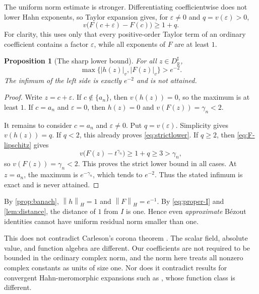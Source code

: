 \documentclass[11pt,letterpaper]{article}
\numberwithin{equation}{section}
\newtheorem{proposition}[theorem]{Proposition}
\theoremstyle{definition}
\theoremstyle{remark}
\newcommand{\R}{\mathbb R}
\newcommand{\norm}[1]{\left\lVert#1\right\rVert}
\begin{document}
The uniform norm estimate is stronger. Differentiating coefficientwise
does not lower Hahn exponents, so Taylor expansion gives, for
$\varepsilon\ne0$ and $q=v(\varepsilon)>0$,
\begin{equation}\label{eq:F-lipschitz}
 v\bigl(F(c+\varepsilon)-F(c)\bigr)\ge1+q.
\end{equation}
For clarity, this uses only that every positive-order Taylor term of an
ordinary coefficient contains a factor $\varepsilon$, while all
exponents of $F$ are at least $1$.

\begin{proposition}[The sharp lower bound]\label{prop:sharp-corona}
For all $z\in D^\sharp_\R$,
\begin{equation}\label{eq:strictlower}
 \max\{|h(z)|_v,|F(z)|_v\}>e^{-2}.
\end{equation}
The infimum of the left side is exactly $e^{-2}$ and is not attained.
\end{proposition}
\begin{proof}
Write $z=c+\varepsilon$. If $c\notin\{a_n\}$, then $v(h(z))=0$, so
the maximum is at least $1$. If $c=a_n$ and $\varepsilon=0$, then
$h(z)=0$ and $v(F(z))=\gamma_n<2$.

It remains to consider $c=a_n$ and $\varepsilon\ne0$. Put
$q=v(\varepsilon)$. Simplicity gives $v(h(z))=q$. If $q<2$, this already
proves \eqref{eq:strictlower}. If $q\ge2$, then
\eqref{eq:F-lipschitz} gives
\[
 v\bigl(F(z)-t^{\gamma_n}\bigr)\ge1+q\ge3>\gamma_n,
\]
so $v(F(z))=\gamma_n<2$. This proves the strict lower bound in all cases.
At $z=a_n$, the maximum is $e^{-\gamma_n}$, which tends to $e^{-2}$.
Thus the stated infimum is exact and is never attained.
\end{proof}

By \cref{prop:banach}, $\norm h_H=1$ and $\norm F_H=e^{-1}$.
By \eqref{eq:proper-I} and \cref{lem:distance}, the distance of $1$ from
$I$ is one. Hence even \emph{approximate} B\'ezout identities cannot have
uniform residual norm smaller than one.

This does not contradict Carleson's corona theorem
\cite{Carleson}. The scalar field, absolute value, and function algebra
are different. Our coefficients are not required to be bounded in the
ordinary complex norm, and the norm here treats all nonzero complex
constants as units of size one. Nor does it contradict results for
convergent Hahn-meromorphic expansions such as \cite{MullerStrohmaier},
whose function class is different.
\end{document}
